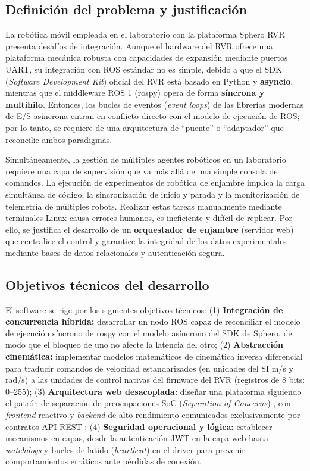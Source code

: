\documentclass[12pt]{article}
\numberwithin{figure}{section}
\numberwithin{table}{section}
\def\code#1{#1}%
\newcommand{\code}[1]{\textcolor{codeblue}{\url{#1}}}
\begin{document}
\subsection{Definición del problema y justificación}

La robótica móvil empleada en el laboratorio con la plataforma Sphero RVR presenta desafíos de integración. Aunque el hardware del RVR ofrece una plataforma mecánica robusta con capacidades de expansión mediante puertos UART, su integración con ROS estándar no es simple, debido a que el SDK (\textit{Software Development Kit}) \cite{AWS_WhatIs_SDK} oficial del RVR está basado en Python y \textbf{asyncio}, mientras que el middleware ROS 1 (\code{rospy}) opera de forma \textbf{síncrona y multihilo}. Entonces, los bucles de eventos (\emph{event loops}) de las librerías modernas de E/S asíncrona entran en conflicto directo con el modelo de ejecución de ROS; por lo tanto, se requiere de una arquitectura de ``puente'' o ``adaptador'' que reconcilie ambos paradigmas.

Simultáneamente, la gestión de múltiples agentes robóticos en un laboratorio requiere una capa de supervisión que va más allá de una simple consola de comandos. La ejecución de experimentos de robótica de enjambre implica la carga simultánea de código, la sincronización de inicio y parada y la monitorización de telemetría de múltiples robots. Realizar estas tareas manualmente mediante terminales Linux causa errores humanos, es ineficiente y difícil de replicar. Por ello, se justifica el desarrollo de un \textbf{orquestador de enjambre} (servidor web) que centralice el control y garantice la integridad de los datos experimentales mediante bases de datos relacionales y autenticación segura.


\subsection{Objetivos técnicos del desarrollo}

El software se rige por los siguientes objetivos técnicos: (1) \textbf{Integración de concurrencia híbrida:} desarrollar un nodo ROS capaz de reconciliar el modelo de ejecución síncrono de \code{rospy} con el modelo asíncrono del SDK de Sphero, de modo que el bloqueo de uno no afecte la latencia del otro; (2) \textbf{Abstracción cinemática:} implementar modelos matemáticos de cinemática inversa diferencial para traducir comandos de velocidad estandarizados (en unidades del SI m/s y rad/s) a las unidades de control nativas del firmware del RVR (registros de 8 bits: 0--255); (3) \textbf{Arquitectura web desacoplada:} diseñar una plataforma siguiendo el patrón de separación de preocupaciones SoC (\textit{Separation of Concerns}) \cite{Dijkstra1974EWD447}, con \textit{frontend} reactivo y \textit{backend} de alto rendimiento comunicados exclusivamente por contratos API REST \cite{OpenAPI_Spec}; (4) \textbf{Seguridad operacional y lógica:} establecer mecanismos en capas, desde la autenticación JWT en la capa web hasta \emph{watchdogs} y bucles de latido (\emph{heartbeat}) en el driver para prevenir comportamientos erráticos ante pérdidas de conexión.
\end{document}
